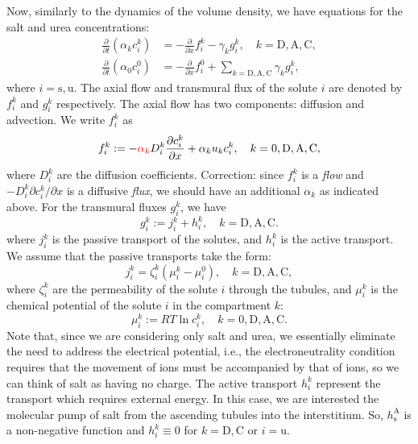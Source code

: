 \documentclass{article}
\begin{document}
Now, similarly to the dynamics of the volume density, we have equations for the salt and urea concentrations:
\begin{align}\label{eq:solute_dynamics}
    \frac{\partial}{\partial t}\left( \alpha_k c_i^k \right)&=-\frac{\partial}{\partial x} f_i^k - \gamma_kg_i^k,\quad k=\mathrm{D},\mathrm{A},\mathrm{C},\\
    \frac{\partial}{\partial t}\left( \alpha_0 c_i^0 \right)&=-\frac{\partial}{\partial x} f_i^0 + \sum_{k=\mathrm{D},\mathrm{A},\mathrm{C}} \gamma_k g_i^k,
\end{align}
    where $i=\mathrm{s},\mathrm{u}$.
The axial flow and transmural flux of the solute $i$ are denoted by $f_i^k$ and $g_i^k$ respectively.
The axial flow has two components: diffusion and advection.
We write $f_i^k$ as
\begin{equation}
    f_i^k := -{\color{red}\alpha_k}D_i^k\frac{\partial c_i^k}{\partial x}+\alpha_ku_kc_i^k,\quad k=0,\mathrm{D},\mathrm{A},\mathrm{C},
\end{equation}
    where $D_i^k$ are the diffusion coefficients.
{\color{red}Correction: since $f_i^k$ is a \textit{flow} and $-D_i^k\partial c_i^k/\partial x$ is a diffusive \textit{flux}, we should have an additional $\alpha_k$ as indicated above.}
For the transmural fluxes $g_i^k$, we have
\begin{equation}
    g_i^k := j_i^k+h_i^k,\quad k=\mathrm{D},\mathrm{A},\mathrm{C}.
\end{equation}
    where $j_i^k$ is the passive transport of the solutes, and $h_i^k$ is the active transport.
We assume that the passive transports take the form:
\begin{equation}
    j_i^k = \zeta_i^k\left( \mu_i^k - \mu_i^0 \right),\quad k=\mathrm{D},\mathrm{A},\mathrm{C},
\end{equation}
    where $\zeta_i^k$ are the permeability of the solute $i$ through the tubules, and $\mu_i^k$ is the chemical potential of the solute $i$ in the compartment $k$:
\begin{equation}
    \mu_i^k:= RT\ln c_i^k,\quad k=0,\mathrm{D},\mathrm{A},\mathrm{C}.
\end{equation}
Note that, since we are considering only salt and urea, we essentially eliminate the need to address the electrical potential, i.e., the electroneutrality condition requires that the movement of  ions must be accompanied by that of  ions, so we can think of salt as having no charge.
The active transport $h_i^k$ represent the transport which requires external energy.
In this case, we are interested the molecular pump of salt from the ascending tubules into the interstitium.
So, $h_\mathrm{s}^\mathrm{A}$ is a non-negative function and $h_i^k\equiv 0$ for $k=\mathrm{D},\mathrm{C}$ or $i=\mathrm{u}$.
\end{document}

